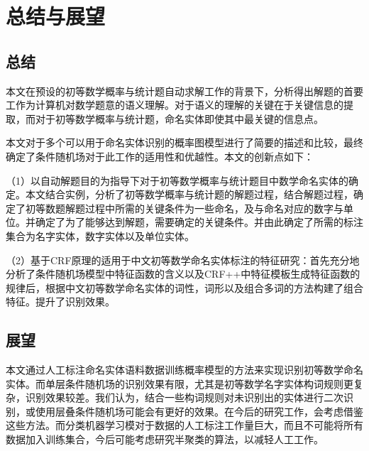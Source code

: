 
\chapter{总结与展望}
\section{总结}
本文在预设的初等数学概率与统计题自动求解工作的背景下，分析得出解题的首要工作为计算机对数学题意的语义理解。对于语义的理解的关键在于关键信息的提取，而对于初等数学概率与统计题，命名实体即使其中最关键的信息点。

本文对于多个可以用于命名实体识别的概率图模型进行了简要的描述和比较，最终确定了条件随机场对于此工作的适用性和优越性。本文的创新点如下：

（1）以自动解题目的为指导下对于初等数学概率与统计题目中数学命名实体的确定。本文结合实例，分析了初等数学概率与统计题的解题过程，结合解题过程，确定了初等数题解题过程中所需的关键条件为一些命名，及与命名对应的数字与单位。并确定了为了能够达到解题，需要确定的关键条件。并由此确定了所需的标注集合为名字实体，数字实体以及单位实体。

（2）基于CRF原理的适用于中文初等数学命名实体标注的特征研究：首先充分地分析了条件随机场模型中特征函数的含义以及CRF++中特征模板生成特征函数的规律后，根据中文初等数学命名实体的词性，词形以及组合多词的方法构建了组合特征。提升了识别效果。

\section{展望}
本文通过人工标注命名实体语料数据训练概率模型的方法来实现识别初等数学命名实体。而单层条件随机场的识别效果有限，尤其是初等数学名字实体构词规则更复杂，识别效果较差。我们认为，结合一些构词规则对未识别出的实体进行二次识别，或使用层叠条件随机场可能会有更好的效果。在今后的研究工作，会考虑借鉴这些方法。而分类机器学习模对于数据的人工标注工作量巨大，而且不可能将所有数据加入训练集合，今后可能考虑研究半聚类的算法，以减轻人工工作。